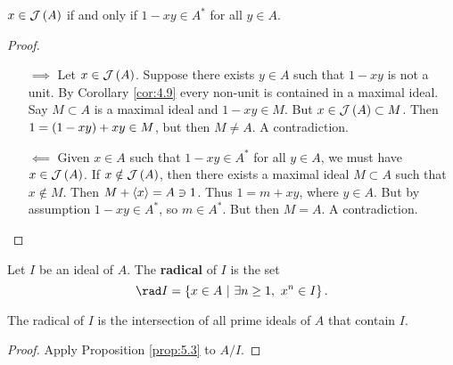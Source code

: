 \begin{proposition}
$ x \in \JJJ\br{A} $ if and only if $ 1 - xy \in A^* $ for all $ y \in A $.
\end{proposition}

\begin{proof}
\hfill
\begin{itemize}
\item[$ \implies $] Let $ x \in \JJJ\br{A} $. Suppose there exists $ y \in A $ such that $ 1 - xy $ is not a unit. By Corollary \ref{cor:4.9} every non-unit is contained in a maximal ideal. Say $ M \subset A $ is a maximal ideal and $ 1 - xy \in M $. But $ x \in \JJJ\br{A} \subset M $. Then $ 1 = \br{1 - xy} + xy \in M $, but then $ M \ne A $. A contradiction.
\item[$ \impliedby $] Given $ x \in A $ such that $ 1 - xy \in A^* $ for all $ y \in A $, we must have $ x \in \JJJ\br{A} $. If $ x \notin \JJJ\br{A} $, then there exists a maximal ideal $ M \subset A $ such that $ x \notin M $. Then $ M + \left\langle x \right\rangle = A \ni 1 $. Thus $ 1 = m + xy $, where $ y \in A $. But by assumption $ 1 - xy \in A^* $, so $ m \in A^* $. But then $ M = A $. A contradiction.
\end{itemize}
\end{proof}

\begin{definition}
Let $ I $ be an ideal of $ A $. The \textbf{radical} of $ I $ is the set
$$ \rad I = \cbr{x \in A \st \exists n \ge 1, \ x^n \in I}. $$
\end{definition}

\begin{proposition}
The radical of $ I $ is the intersection of all prime ideals of $ A $ that contain $ I $.
\end{proposition}

\begin{proof}
Apply Proposition \ref{prop:5.3} to $ A / I $.
\end{proof}

